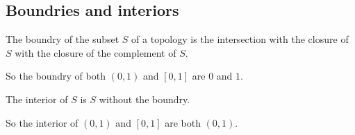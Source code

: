 
\subsection{Boundries and interiors}

The boundry of the subset \(S\) of a topology is the intersection with the closure of \(S\) with the closure of the complement of \(S\).

So the boundry of both \((0,1)\) and \([0,1]\) are \(0\) and \(1\).

The interior of \(S\) is \(S\) without the boundry.

So the interior of \((0,1)\) and \([0,1]\) are both \((0,1)\).

